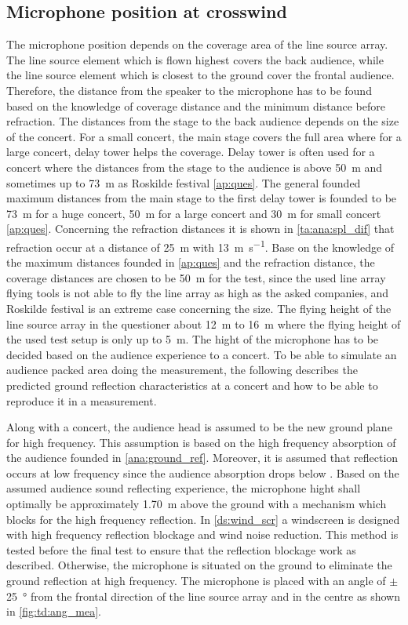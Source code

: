 \subsection{Microphone position at crosswind}
The microphone position depends on the coverage area of the line source array. The line source element which is flown highest covers the back audience, while the line source element which is closest to the ground cover the frontal audience. Therefore, the distance from the speaker to the microphone has to be found based on the knowledge of coverage distance and the minimum distance before refraction. The distances from the stage to the back audience depends on the size of the concert. For a small concert, the main stage covers the full area where for a large concert, delay tower helps the coverage. Delay tower is often used for a concert where the distances from the stage to the audience is above \SI{50}{\meter} and sometimes up to \SI{73}{\meter} as Roskilde festival \autoref{ap:ques}. The general founded maximum distances from the main stage to the first delay tower is founded to be \SI{73}{\meter} for a huge concert, \SI{50}{\meter} for a large concert and \SI{30}{\meter} for small concert \autoref{ap:ques}. 
Concerning the refraction distances it is shown in \autoref{ta:ana:spl_dif} that refraction occur at a distance of \SI{25}{\meter} with \SI{13}{\meter\per\second}.
Base on the knowledge of the maximum distances founded in \autoref{ap:ques} and the refraction distance, the coverage distances are chosen to be \SI{50}{\meter} for the test, since the used line array flying tools is not able to fly the line array as high as the asked companies, and Roskilde festival is an extreme case concerning the size. The flying height of the line source array in the questioner about \SI{12}{\meter} to \SI{16}{\meter} where the flying height of the used test setup is only up to \SI{5}{\meter}.  
The hight of the microphone has to be decided based on the audience experience to a concert. To be able to simulate an audience packed area doing the measurement, the following describes the predicted ground reflection characteristics at a concert and how to be able to reproduce it in a measurement. 

Along with a concert, the audience head is assumed to be the new ground plane for high frequency. This assumption is based on the high frequency absorption of the audience founded in \autoref{ana:ground_ref}. Moreover, it is assumed that reflection occurs at low frequency since the audience absorption drops below . Based on the assumed audience sound reflecting experience, the microphone hight shall optimally be approximately \SI{1.70}{\meter} above the ground with a mechanism which blocks for the high frequency reflection. In \autoref{ds:wind_scr} a windscreen is designed with high frequency reflection blockage and wind noise reduction. This method is tested before the final test to ensure that the reflection blockage work as described. Otherwise, the microphone is situated on the ground to eliminate the ground reflection at high frequency. The microphone is placed with an angle of $\pm$ \SI{25}{\degree} from the frontal direction of the line source array and in the centre as shown in \autoref{fig:td:ang_mea}.

